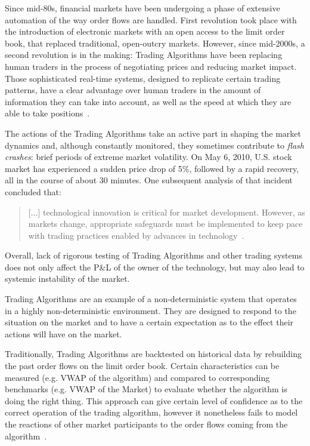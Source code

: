 Since mid-80s, financial markets have been undergoing a phase of extensive automation of the way order flows are handled. First revolution took place with the introduction of electronic markets with an open access to the limit order book, that replaced traditional, open-outcry markets. However, since mid-2000s, a second revolution is in the making: Trading Algorithms have been replacing human traders in the process of negotiating prices and reducing market impact. Those sophisticated real-time systems, designed to replicate certain trading patterns, have a clear advantage over human traders in the amount of information they can take into account, as well as the speed at which they are able to take positions~\cite{Lenglet}.

The actions of the Trading Algorithms take an active part in shaping the market dynamics and, although constantly monitored, they sometimes contribute to \emph{flash crashes}: brief periods of extreme market volatility. On May 6, 2010, U.S. stock market has experienced a sudden price drop of 5\%, followed by a rapid recovery, all in the course of about 30 minutes. One subsequent analysis of that incident concluded that:
\begin{quote}
[$\ldots$] technological innovation is critical for market development. However, as markets change, appropriate safeguards must be implemented to keep pace with trading practices enabled by advances in technology~\cite{Kirilenko2011}.
\end{quote}
Overall, lack of rigorous testing of Trading Algorithms and other trading systems does not only affect the P\&L  of the owner of the technology, but may also lead to systemic instability of the market.

Trading Algorithms are an example of a non-deterministic system that operates in a highly non-deterministic environment. They are designed to respond to the situation on the market and to have a certain expectation as to the effect their actions will have on the market.

Traditionally, Trading Algorithms are backtested on historical data by rebuilding the past order flows on the limit order book. Certain characteristics can be measured (e.g. VWAP of the algorithm) and compared to corresponding benchmarks (e.g. VWAP of the Market) to evaluate whether the algorithm is doing the right thing. This approach can give certain level of confidence as to the correct operation of the trading algorithm, however it nonetheless fails to model the reactions of other market participants to the order flows coming from the algorithm~\cite{Coggins2006}.

